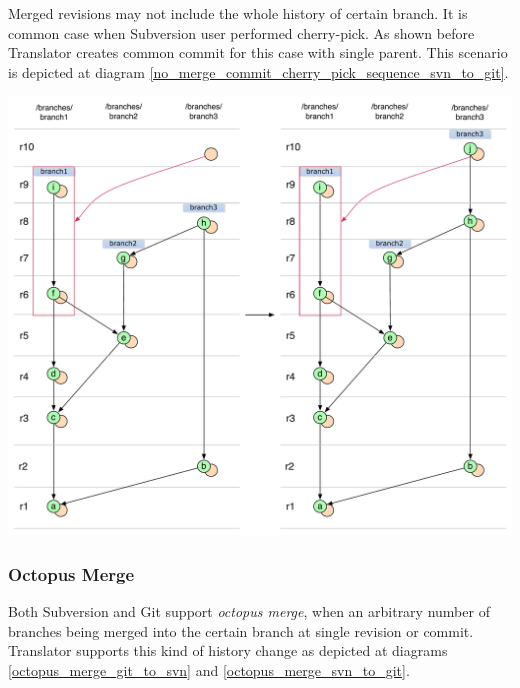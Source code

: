 Merged revisions may not include the whole history of certain branch. It is common case when Subversion user performed cherry-pick. As shown before Translator creates common commit for this case with single parent. This scenario is depicted at diagram \ref{no_merge_commit_cherry_pick_sequence_svn_to_git}.

\begin{center}
\includegraphics[width=\textwidth]{img/diagrams/no_merge_commit_cherry_pick_sequence_svn_to_git.pdf}%
\label{no_merge_commit_cherry_pick_sequence_svn_to_git}%
\end{center}

\subsubsection{Octopus Merge}

Both Subversion and Git support \emph{octopus merge}, when an arbitrary number of branches being merged into the certain branch at single revision or commit. Translator supports this kind of history change as depicted at diagrams \ref{octopus_merge_git_to_svn} and \ref{octopus_merge_svn_to_git}.

